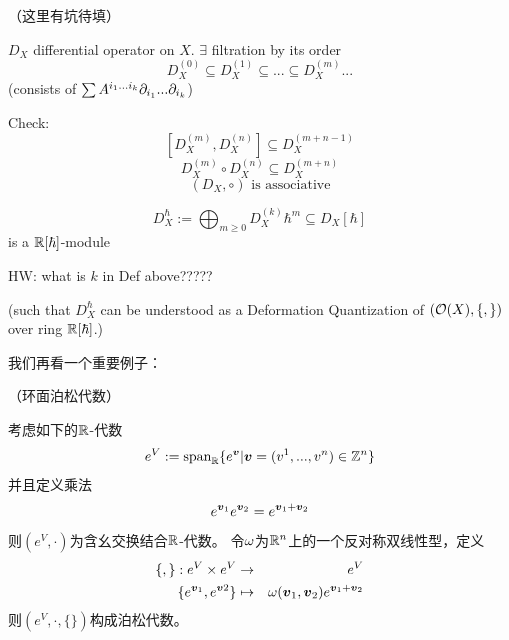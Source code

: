 {\color{red}
（这里有坑待填）}
{\color{gray}

$D_X$ differential operator on $X$.
$\exists$ filtration by its order
$$D_X^{(0)}\subseteq D_X^{(1)}\subseteq...\subseteq D_X^{(m)}...$$
(consists of $\sum A^{i_1...i_k}\partial_{i_1}...\partial_{i_k}$)

Check:
$$[D_X^{(m)},D_X^{(n)}]\subseteq D_X^{(m+n-1)}$$
$$D_X^{(m)}\circ D_X^{(n)}\subseteq D_X^{(m+n)}$$
$$(D_X,\circ)\text{ is associative}$$

$$D_X^{\hbar}:=\bigoplus_{m\geq 0}D^{(k)}_X\hbar^m\subseteq D_X[\hbar]$$
is a $\mathbb{R}[\hbar]$-module

HW: what is $k$ in Def above?????

(such that $D_X^{\hbar}$ can be understood as a Deformation Quantization of
$(\mathcal{O}(X),\{,\})$ over ring $\mathbb{R}[\hbar]$.)

}

我们再看一个重要例子：


\begin{Example}（环面泊松代数）

考虑如下的$\mathbb{R}$-代数
$$e^V:=\operatorname{span}_{\mathbb{R}}\{e^{\boldsymbol{v}}|\boldsymbol{v}=(v^1,...,v^n)\in\mathbb{Z}^n\}$$
并且定义乘法
$$e^{\boldsymbol{v}_1}e^{\boldsymbol{v}_2}=e^{\boldsymbol{v}_1+\boldsymbol{v}_2}$$
则$(e^V,\cdot)$为含幺交换结合$\mathbb{R}$-代数。
令$\omega$为$\mathbb{R}^n$上的一个反对称双线性型，定义
\begin{eqnarray*}
\{,\}:e^V\times e^V &\to& e^V\\
\{e^{\boldsymbol{v}_1},e^{\boldsymbol{v}2}\}&\mapsto&\omega(\boldsymbol{v}_1,\boldsymbol{v}_2)e^{\boldsymbol{v}_1+\boldsymbol{v}_2}
\end{eqnarray*}
则$(e^V,\cdot,\{\})$构成泊松代数。
\end{Example}

